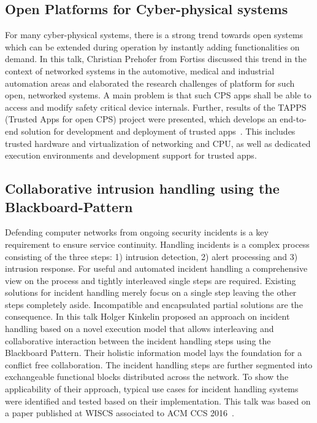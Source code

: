 
\subsection{Open Platforms for Cyber-physical systems}

For many cyber-physical systems, there is a strong trend towards open systems which can be extended during operation by instantly adding functionalities on demand. In this talk, Christian Prehofer from Fortiss discussed this trend in the context of networked systems in the automotive, medical and industrial automation areas and elaborated the research challenges of platform for such open, networked systems. A main problem is that such CPS apps shall be able to access and modify safety critical device internals. Further, results of the TAPPS (Trusted Apps for open CPS) project were presented, which  develops an end-to-end solution for development and deployment of trusted apps~\cite{Prehofer2016}. This includes trusted hardware and virtualization of networking and CPU, as well as dedicated execution environments and development support for trusted apps. 


\subsection{Collaborative intrusion handling using the Blackboard-Pattern}

Defending computer networks from ongoing security incidents is a key requirement to ensure service continuity. Handling incidents is a complex process consisting of the three steps: 1) intrusion detection, 2) alert processing and 3) intrusion response. For useful and automated incident handling a comprehensive view on the process and tightly interleaved single steps are required. Existing solutions for incident handling merely focus on a single step leaving the other steps completely aside. Incompatible and encapsulated partial solutions are the consequence. In this talk Holger Kinkelin proposed an approach on incident handling based on a novel execution model that allows interleaving and collaborative interaction between the incident handling steps using the Blackboard Pattern. Their holistic information model lays the foundation for a conflict free collaboration. The incident handling steps are further segmented into exchangeable functional blocks distributed across the network. To show the applicability of their approach, typical use cases for incident handling systems were identified and tested based on their implementation. This talk was based on a paper published at WISCS associated to ACM CCS 2016~\cite{Herold2016}.


